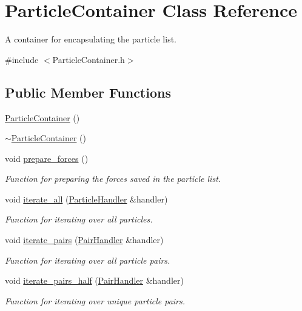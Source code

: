 \hypertarget{classParticleContainer}{\section{Particle\-Container Class Reference}
\label{classParticleContainer}
}


A container for encapsulating the particle list.  




{\ttfamily \#include $<$Particle\-Container.\-h$>$}

\subsection*{Public Member Functions}
\begin{DoxyCompactItemize}
\item 
\hyperlink{classParticleContainer_a76d21bdb5141158cf664d65e2d8b1db7}{Particle\-Container} ()
\item 
\hyperlink{classParticleContainer_a9629a8d31a3aa8c2fe944307c1263b66}{$\sim$\-Particle\-Container} ()
\item 
void \hyperlink{classParticleContainer_adf9993d21144e346ad75239a16250b64}{prepare\-\_\-forces} ()
\begin{DoxyCompactList}\small\item\em Function for preparing the forces saved in the particle list. \end{DoxyCompactList}\item 
void \hyperlink{classParticleContainer_a10677cdeed54a9cdd96463c93699efe1}{iterate\-\_\-all} (\hyperlink{classParticleHandler}{Particle\-Handler} \&handler)
\begin{DoxyCompactList}\small\item\em Function for iterating over all particles. \end{DoxyCompactList}\item 
void \hyperlink{classParticleContainer_add37a28087b0fc1460fe8ddd23d391ce}{iterate\-\_\-pairs} (\hyperlink{classPairHandler}{Pair\-Handler} \&handler)
\begin{DoxyCompactList}\small\item\em Function for iterating over all particle pairs. \end{DoxyCompactList}\item 
void \hyperlink{classParticleContainer_acd8295ee8c34cc4d27d62288e6e24dfd}{iterate\-\_\-pairs\-\_\-half} (\hyperlink{classPairHandler}{Pair\-Handler} \&handler)
\begin{DoxyCompactList}\small\item\em Function for iterating over unique particle pairs. \end{DoxyCompactList}\end{DoxyCompactItemize}
